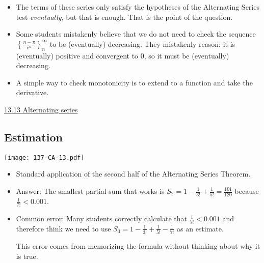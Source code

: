 \documentclass[11pt]{article}
\newcommand {\DS} [1] {${\displaystyle #1}$}
\newcommand{\nl}{\hfill \vspace{-1.1\baselineskip}} %
\newcommand{\vxiii}{\hspace{8mm} \href{https://www.youtube.com/watch?v=OM9U6Pwze8E&list=PLlwePzQY_wW-FJMnD_ybkXU_jZLVtZttI&index=13}{13.13 Alternating series} }
\begin{document}
\begin{comments}
\nl
	\begin{itemize}
		\item   The terms of these series only satisfy the hypotheses of the Alternating Series test \emph{eventually}, but that is enough.  That is the point of the question.
		\item Some students mistakenly believe that we do not need to check the sequence \DS{\left\{ \frac{n - \pi}{e^n} \right\}_{n}^{\infty}} to be (eventually) decreasing.   They mistakenly reason: it is (eventually) positive and convergent to 0, so it must be (eventually) decreasing.    
		
		\item A simple way to check monotonicity is to extend to a function and take the derivative.
	\end{itemize}
\end{comments}

\begin{videos}
\vxiii
\end{videos}

\newpage
\subsection{Estimation}

\begin{center}
{ \texttt{[image: 137-CA-13.pdf]}} 
\end{center}

\begin{comments}
\nl
	\begin{itemize}
		\item   Standard application of the second half of the Alternating Series Theorem.
		\item Answer:  
		The smallest partial sum that works is \; \DS{S_2 = 1 - \frac{1}{3!} + \frac{1}{5!} = \frac{101}{120}} \; because \; \DS{\frac{1}{7!} < 0.001}.
		
		\item Common error: Many students correctly calculate that \DS{\frac{1}{7!} < 0.001} and therefore think we need to use 
			\DS{S_3 = 1 - \frac{1}{3!} + \frac{1}{5!} - \frac{1}{7!}} as an estimate.
			
			This error comes from memorizing the formula without thinking about why it is true.
	\end{itemize}
\end{comments}
\end{document}
